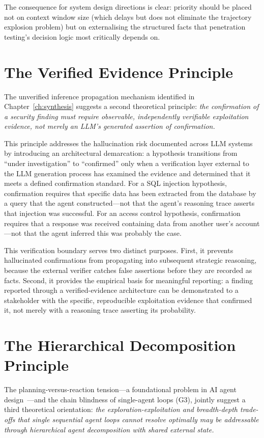 \documentclass[12pt,a4paper,oneside,openany]{book}
\begin{document}
The consequence for system design directions is clear: priority should be placed not on context window size (which delays but does not eliminate the trajectory explosion problem) but on externalising the structured facts that penetration testing's decision logic most critically depends on.

\section{The Verified Evidence Principle}

The unverified inference propagation mechanism identified in Chapter~\ref{ch:synthesis} suggests a second theoretical principle: \textit{the confirmation of a security finding must require observable, independently verifiable exploitation evidence, not merely an LLM's generated assertion of confirmation.}

This principle addresses the hallucination risk documented across LLM systems~\citep{ji2023survey} by introducing an architectural demarcation: a hypothesis transitions from ``under investigation'' to ``confirmed'' only when a verification layer external to the LLM generation process has examined the evidence and determined that it meets a defined confirmation standard. For a SQL injection hypothesis, confirmation requires that specific data has been extracted from the database by a query that the agent constructed---not that the agent's reasoning trace asserts that injection was successful. For an access control hypothesis, confirmation requires that a response was received containing data from another user's account---not that the agent inferred this was probably the case.

This verification boundary serves two distinct purposes. First, it prevents hallucinated confirmations from propagating into subsequent strategic reasoning, because the external verifier catches false assertions before they are recorded as facts. Second, it provides the empirical basis for meaningful reporting: a finding reported through a verified-evidence architecture can be demonstrated to a stakeholder with the specific, reproducible exploitation evidence that confirmed it, not merely with a reasoning trace asserting its probability.

\section{The Hierarchical Decomposition Principle}

The planning-versus-reaction tension---a foundational problem in AI agent design~\citep{russell2020ai}---and the chain blindness of single-agent loops (G3), jointly suggest a third theoretical orientation: \textit{the exploration-exploitation and breadth-depth trade-offs that single sequential agent loops cannot resolve optimally may be addressable through hierarchical agent decomposition with shared external state.}
\end{document}

